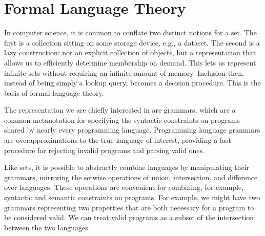 \chapter{\rm\bfseries Formal Language Theory}
\label{ch:chapter01}

In computer science, it is common to conflate two distinct notions for a set. The first is a collection sitting on some storage device, e.g., a dataset. The second is a lazy construction: not an explicit collection of objects, but a representation that allows us to efficiently determine membership on demand. This lets us represent infinite sets without requiring an infinite amount of memory. Inclusion then, instead of being simply a lookup query, becomes a decision procedure. This is the basis of formal language theory.

The representation we are chiefly interested in are grammars, which are a common metanotation for specifying the syntactic constraints on programs shared by nearly every programming language. Programming language grammars are overapproximations to the true language of interest, providing a fast procedure for rejecting invalid programs and parsing valid ones.

Like sets, it is possible to abstractly combine languages by manipulating their grammars, mirroring the setwise operations of union, intersection, and difference over languages. These operations are convenient for combining, for example, syntactic and semantic constraints on programs. For example, we might have two grammars representing two properties that are both necessary for a program to be considered valid. We can treat valid programs as a subset of the intersection between the two languages.